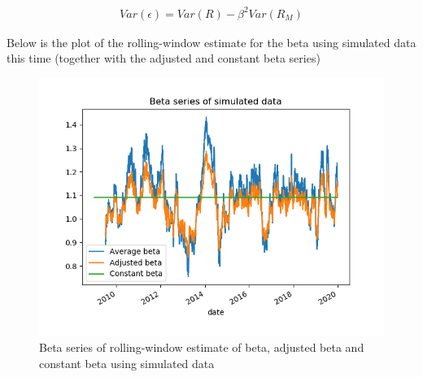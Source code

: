 \documentclass[10pt]{article}
\newenvironment{exercise}[2][Exercise]{\begin{trivlist}
  \item[\hskip \labelsep {\bfseries #1}\hskip \labelsep {\bfseries #2.}]}{\end{trivlist}}
\begin{document}
\begin{exercise}{2}
	\begin{align*}
		Var(\epsilon) = Var(R) - \beta^{2} Var(R_{M})
	\end{align*}
	
	Below is the plot of the rolling-window estimate for the beta using simulated data this time (together with the adjusted and constant beta series)
	
	\begin{figure}[H]
	
		\centering
		\includegraphics[scale=0.8]{figures/ex2_3.png}	
		\caption{Beta series of rolling-window estimate of beta, adjusted beta and constant beta using simulated data}	
		\label{fig:ex2_2}
				
	\end{figure}
		
\end{exercise}

\newpage

\begin{exercise}{3}

\end{exercise}

\newpage
\end{document}
